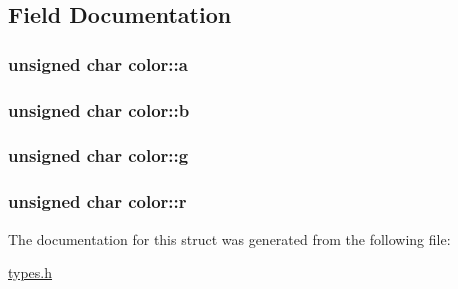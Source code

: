 \subsection{Field Documentation}
\hypertarget{structcolor_a5b6b6fa87e1ea08d62dd2ddda8358bf4}{
\subsubsection[{a}]{\setlength{\rightskip}{0pt plus 5cm}unsigned char {\bf color::a}}}
\label{structcolor_a5b6b6fa87e1ea08d62dd2ddda8358bf4}
\hypertarget{structcolor_a3c8a2e9dac4499a3fa1fce76a6491db0}{
\subsubsection[{b}]{\setlength{\rightskip}{0pt plus 5cm}unsigned char {\bf color::b}}}
\label{structcolor_a3c8a2e9dac4499a3fa1fce76a6491db0}
\hypertarget{structcolor_aee30bc30855695b3baf97597387f13f5}{
\subsubsection[{g}]{\setlength{\rightskip}{0pt plus 5cm}unsigned char {\bf color::g}}}
\label{structcolor_aee30bc30855695b3baf97597387f13f5}
\hypertarget{structcolor_a0554e0c9f9fabb6b03cffa5bddaca93f}{
\subsubsection[{r}]{\setlength{\rightskip}{0pt plus 5cm}unsigned char {\bf color::r}}}
\label{structcolor_a0554e0c9f9fabb6b03cffa5bddaca93f}


The documentation for this struct was generated from the following file:\begin{DoxyCompactItemize}
\item 
\hyperlink{types_8h}{types.h}\end{DoxyCompactItemize}
